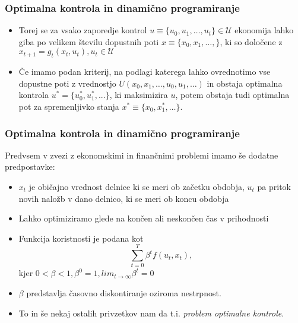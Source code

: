 \documentclass{beamer}
\begin{document}
\begin{frame}
\frametitle{Optimalna kontrola in dinamično programiranje}

\begin{itemize}
\item Torej se za vsako zaporedje kontrol $u \equiv \{u_0, u_1, \ldots, u_t\} \in \mathcal{U}$ ekonomija lahko giba po velikem številu dopustnih poti $x \equiv \{ x_0, x_1, \ldots, \}$, ki so določene z $x_{t+1} = g_t(x_t,u_t), u_t \in \mathcal{U}$ \newline
\item Če imamo podan kriterij, na podlagi katerega lahko ovrednotimo vse dopustne poti z vrednostjo $U(x_0, x_1, \ldots , u_0, u_1, \ldots)$ in obstaja optimalna kontrola $u^* = \{u_0^*, u_1^*, ...\}$, ki maksimizira $u$, potem obstaja tudi optimalna pot za spremenljivko stanja $x^* \equiv \{x_0, x_1^*,  \ldots \}$.

\end{itemize}

\end{frame}

\begin{frame}
\frametitle{Optimalna kontrola in dinamično programiranje}

Predvsem v zvezi z ekonomskimi in finančnimi problemi imamo še dodatne predpostavke:

\begin{itemize}
\item $x_t$ je običajno vrednost delnice ki se meri ob začetku obdobja, $u_t$ pa pritok novih naložb v dano delnico, ki se meri ob koncu obdobja
\item Lahko optimiziramo glede na končen ali neskončen čas v prihodnosti
\item Funkcija koristnosti je podana kot 
\begin{equation} 
\sum_{t=0}^T \beta^t f(u_t, x_t),
\end{equation}
kjer $0 < \beta < 1, \beta^0 = 1, lim_{t\to\infty} \beta^t = 0$
\item $\beta$ predstavlja časovno diskontiranje oziroma nestrpnost.
\item To in še nekaj ostalih privzetkov nam da t.i. \textit{problem optimalne kontrole}.
\end{itemize}

\end{frame}
\end{document}
